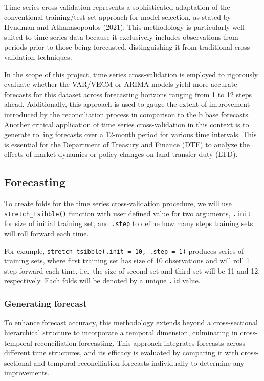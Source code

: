 \documentclass[11pt,a4paper,]{article}
\begin{document}
Time series cross-validation represents a sophisticated adaptation of the conventional training/test set approach for model selection, as stated by Hyndman and Athanasopoulos (2021). This methodology is particularly well-suited to time series data because it exclusively includes observations from periods prior to those being forecasted, distinguishing it from traditional cross-validation techniques.

In the scope of this project, time series cross-validation is employed to rigorously evaluate whether the VAR/VECM or ARIMA models yield more accurate forecasts for this dataset across forecasting horizons ranging from 1 to 12 steps ahead. Additionally, this approach is used to gauge the extent of improvement introduced by the reconciliation process in comparison to the b base forecasts. Another critical application of time series cross-validation in this context is to generate rolling forecasts over a 12-month period for various time intervals. This is essential for the Department of Treasury and Finance (DTF) to analyze the effects of market dynamics or policy changes on land transfer duty (LTD).

\subsection{Forecasting}\label{forecasting}

To create folds for the time series cross-validation procedure, we will use \texttt{stretch\_tsibble()} function with user defined value for two arguments, \texttt{.init} for size of initial training set, and \texttt{.step} to define how many steps training sets will roll forward each time.

For example, \texttt{stretch\_tsibble(.init\ =\ 10,\ .step\ =\ 1)} produces series of training sets, where first training set has size of 10 observations and will roll 1 step forward each time, i.e.~the size of second set and third set will be 11 and 12, respectively. Each folds will be denoted by a unique \texttt{.id} value.

\subsubsection{Generating forecast}\label{generating-forecast}

To enhance forecast accuracy, this methodology extends beyond a cross-sectional hierarchical structure to incorporate a temporal dimension, culminating in cross-temporal reconciliation forecasting. This approach integrates forecasts across different time structures, and its efficacy is evaluated by comparing it with cross-sectional and temporal reconciliation forecasts individually to determine any improvements.
\end{document}
